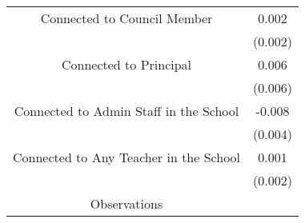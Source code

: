 \begin{tabular}{c|c}

Connected to Council Member&       0.002         \\
                    &     (0.002)         \\
\addlinespace
Connected to Principal&       0.006         \\
                    &     (0.006)         \\
\addlinespace
Connected to Admin Staff in the School&      -0.008\sym{*}  \\
                    &     (0.004)         \\
\addlinespace
Connected to Any Teacher in the School&       0.001         \\
                    &     (0.002)         \\
\midrule
Observations        &                     \\
\end{tabular}